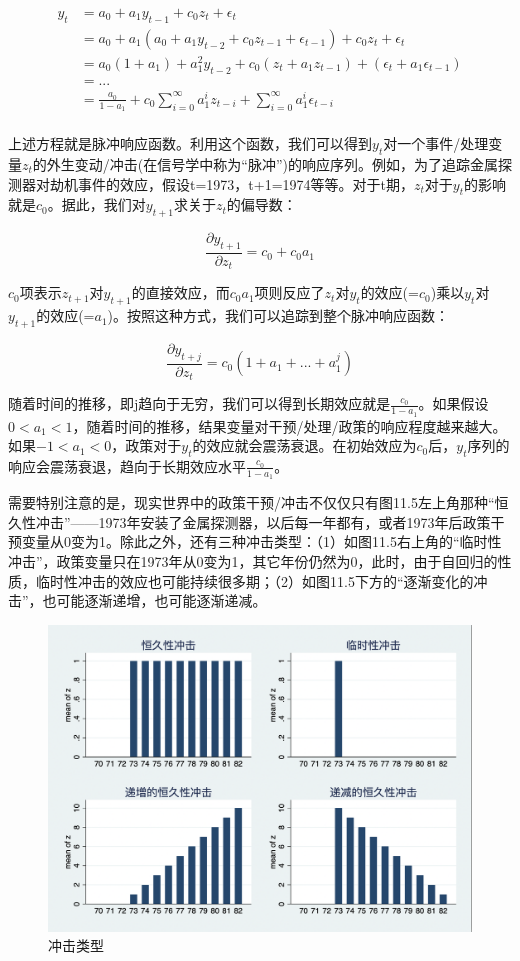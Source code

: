 \documentclass[cn,12pt,math=newtx,citestyle=gb7714-2015,bibstyle=gb7714-2015]{elegantbook}
\begin{document}
	\begin{align*}
		y_t & = a_0 +a_1 y_{t-1} +c_0 z_t +\epsilon_t \\
		&  = a_0 +a_1 (a_0 +a_1 y_{t-2} +c_0 z_{t-1} +\epsilon_{t-1}) +c_0 z_t +\epsilon_t \\
		& = a_0(1 +a_1) + a_1^2 y_{t-2} +c_0 (z_t+a_1 z_{t-1})+(\epsilon_t+a_1 \epsilon_{t-1})\\
		& = ... \\
		& = \frac{a_0}{1-a_1} +c_0 \sum_{i=0}^{\infty}a_1^i z_{t-i} +\sum_{i=0}^{\infty}a_1^i \epsilon_{t-i}\\
	\end{align*}

    上述方程就是脉冲响应函数。利用这个函数，我们可以得到$y_t$对一个事件/处理变量$z_t$的外生变动/冲击(在信号学中称为“脉冲”)的响应序列。例如，为了追踪金属探测器对劫机事件的效应，假设t=1973，t+1=1974等等。对于t期，$z_t$对于$y_t$的影响就是$c_0$。据此，我们对$y_{t+1}$求关于$z_t$的偏导数：
    
    $$\frac{\partial y_{t+1}}{\partial z_t} = c_0+c_0a_1$$

    $c_0$项表示$z_{t+1}$对$y_{t+1}$的直接效应，而$c_0a_1$项则反应了$z_t$对$y_t$的效应(=$c_0$)乘以$y_t$对$y_{t+1}$的效应(=$a_1$)。按照这种方式，我们可以追踪到整个脉冲响应函数：
    
   $$\frac{\partial y_{t+j}}{\partial z_t} = c_0(1+a_1+...+a_1^j)$$
   
   随着时间的推移，即j趋向于无穷，我们可以得到长期效应就是$\frac{c_0}{1-a_1}$。如果假设$0<a_1<1$，随着时间的推移，结果变量对干预/处理/政策的响应程度越来越大。如果$-1<a_1<0$，政策对于$y_t$的效应就会震荡衰退。在初始效应为$c_0$后，$y_t$序列的响应会震荡衰退，趋向于长期效应水平$\frac{c_0}{1-a_1}$。
   
   需要特别注意的是，现实世界中的政策干预/冲击不仅仅只有图11.5左上角那种“恒久性冲击”——1973年安装了金属探测器，以后每一年都有，或者1973年后政策干预变量从0变为1。除此之外，还有三种冲击类型：（1）如图11.5右上角的“临时性冲击”，政策变量只在1973年从0变为1，其它年份仍然为0，此时，由于自回归的性质，临时性冲击的效应也可能持续很多期；（2）如图11.5下方的“逐渐变化的冲击”，也可能逐渐递增，也可能逐渐递减。
   
   \begin{figure}[tbph]
   	\centering
   	\includegraphics[width=0.8\linewidth]{shock_type}
   	\caption{冲击类型}
   	\label{fig:shocktype}
   \end{figure}
   
\end{document}
